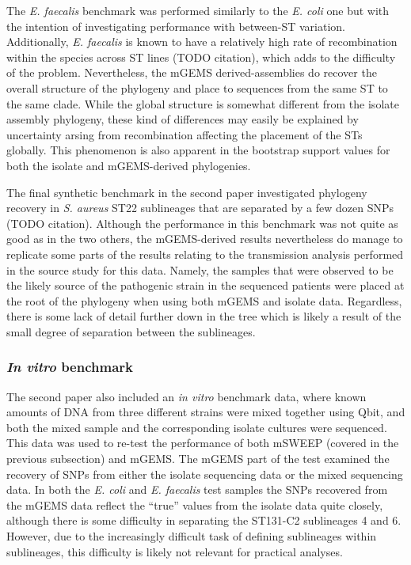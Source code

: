 \documentclass[officiallayout]{tktla}
\begin{document}
The \textit{E. faecalis} benchmark was performed similarly to the
\textit{E. coli} one but with the intention of investigating
performance with between-ST variation. Additionally,
\textit{E. faecalis} is known to have a relatively high rate of
recombination within the species across ST lines (TODO citation),
which adds to the difficulty of the problem. Nevertheless, the mGEMS
derived-assemblies do recover the overall structure of the phylogeny
and place to sequences from the same ST to the same clade. While the
global structure is somewhat different from the isolate assembly
phylogeny, these kind of differences may easily be explained by
uncertainty arsing from recombination affecting the placement of the
STs globally. This phenomenon is also apparent in the bootstrap
support values for both the isolate and mGEMS-derived phylogenies.

The final synthetic benchmark in the second paper investigated
phylogeny recovery in \textit{S. aureus} ST22 sublineages that are
separated by a few dozen SNPs (TODO citation). Although the
performance in this benchmark was not quite as good as in the two
others, the mGEMS-derived results nevertheless do manage to replicate
some parts of the results relating to the transmission analysis
performed in the source study for this data. Namely, the samples that
were observed to be the likely source of the pathogenic strain in the
sequenced patients were placed at the root of the phylogeny when using
both mGEMS and isolate data. Regardless, there is some lack of detail
further down in the tree which is likely a result of the small degree
of separation between the sublineages.

\subsubsection{\textit{In vitro} benchmark}

The second paper also included an \textit{in vitro} benchmark data,
where known amounts of DNA from three different strains were mixed
together using Qbit, and both the mixed sample and the corresponding
isolate cultures were sequenced. This data was used to re-test the
performance of both mSWEEP (covered in the previous subsection) and
mGEMS. The mGEMS part of the test examined the recovery of SNPs from
either the isolate sequencing data or the mixed sequencing data. In
both the \textit{E. coli} and \textit{E. faecalis} test samples the
SNPs recovered from the mGEMS data reflect the ``true'' values from
the isolate data quite closely, although there is some difficulty in
separating the ST131-C2 sublineages 4 and 6. However, due to the
increasingly difficult task of defining sublineages within
sublineages, this difficulty is likely not relevant for practical
analyses.
\end{document}
